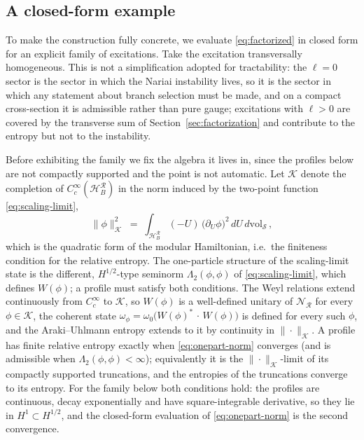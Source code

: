 \documentclass[11pt]{article}
\newcommand{\Nariai}{Nariai}
\begin{document}
\subsection{A closed-form example}
\label{sec:example}

To make the construction fully concrete, we evaluate \eqref{eq:factorized} in closed form for an explicit family of excitations. Take the excitation transversally homogeneous. This is not a simplification adopted for tractability: the $\ell = 0$ sector is the sector in which the \Nariai{} instability lives, so it is the sector in which any statement about branch selection must be made, and on a compact cross-section it is admissible rather than pure gauge; excitations with $\ell > 0$ are covered by the transverse sum of Section~\ref{sec:factorization} and contribute to the entropy but not to the instability.

Before exhibiting the family we fix the algebra it lives in, since the profiles below are not compactly supported and the point is not automatic. Let $\mathcal{K}$ denote the completion of $C_c^\infty(\mathcal{H}_B^{\mathcal{R}})$ in the norm induced by the two-point function \eqref{eq:scaling-limit},
\begin{equation}
\|\phi\|_{\mathcal{K}}^{2}
\;=\;
\int_{\mathcal{H}_B^{\mathcal{R}}} (-U)\,\big(\partial_U \phi\big)^{2}\,
dU\, d\mathrm{vol}_{\mathcal{S}}\,,
\label{eq:onepart-norm}
\end{equation}
which is the quadratic form of the modular Hamiltonian, i.e.\ the finiteness condition for the relative entropy. The one-particle structure of the scaling-limit state is the different, $H^{1/2}$-type seminorm $\Lambda_2(\phi,\phi)$ of \eqref{eq:scaling-limit}, which defines $W(\phi)$; a profile must satisfy both conditions. The Weyl relations extend continuously from $C_c^\infty$ to $\mathcal{K}$, so $W(\phi)$ is a well-defined unitary of $\mathscr{N}_{\mathcal{R}}$ for every $\phi \in \mathcal{K}$, the coherent state $\omega_\phi = \omega_0\big(W(\phi)^{*}\,\cdot\,W(\phi)\big)$ is defined for every such $\phi$, and the Araki--Uhlmann entropy extends to it by continuity in $\|\cdot\|_{\mathcal{K}}$. A profile has finite relative entropy exactly when \eqref{eq:onepart-norm} converges (and is admissible when $\Lambda_2(\phi,\phi)<\infty$); equivalently it is the $\|\cdot\|_{\mathcal{K}}$-limit of its compactly supported truncations, and the entropies of the truncations converge to its entropy. For the family below both conditions hold: the profiles are continuous, decay exponentially and have square-integrable derivative, so they lie in $H^1\subset H^{1/2}$, and the closed-form evaluation of \eqref{eq:onepart-norm} is the second convergence.
\end{document}
